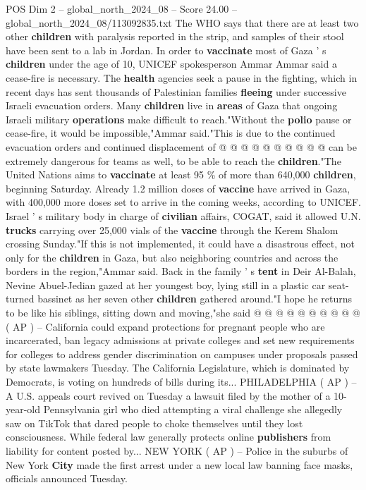 \begin{textsample}{POS Dim 2 – global\_north\_2024\_08 – Score 24.00 – global\_north\_2024\_08/113092835.txt}
The WHO says that there are at least two other \textbf{children} with paralysis reported in the strip, and samples of their stool have been sent to a lab in Jordan.
In order to \textbf{vaccinate} most of Gaza ' s \textbf{children} under the age of 10, UNICEF spokesperson Ammar Ammar said a cease-fire is necessary.
The \textbf{health} agencies seek a pause in the fighting, which in recent days has sent thousands of Palestinian families \textbf{fleeing} under successive Israeli evacuation orders.
Many \textbf{children} live in \textbf{areas} of Gaza that ongoing Israeli military \textbf{operations} make difficult to reach."Without the \textbf{polio} pause or cease-fire, it would be impossible,"Ammar said."This is due to the continued evacuation orders and continued displacement of @ @ @ @ @ @ @ @ @ @ can be extremely dangerous for teams as well, to be able to reach the \textbf{children}."The United Nations aims to \textbf{vaccinate} at least 95 \% of more than 640,000 \textbf{children}, beginning Saturday.
Already 1.2 million doses of \textbf{vaccine} have arrived in Gaza, with 400,000 more doses set to arrive in the coming weeks, according to UNICEF.
Israel ' s military body in charge of \textbf{civilian} affairs, COGAT, said it allowed U.N. \textbf{trucks} carrying over 25,000 vials of the \textbf{vaccine} through the Kerem Shalom crossing Sunday."If this is not implemented, it could have a disastrous effect, not only for the \textbf{children} in Gaza, but also neighboring countries and across the borders in the region,"Ammar said.
Back in the family ' s \textbf{tent} in Deir Al-Balah, Nevine Abuel-Jedian gazed at her youngest boy, lying still in a plastic car seat-turned bassinet as her seven other \textbf{children} gathered around."I hope he returns to be like his siblings, sitting down and moving,"she said @ @ @ @ @ @ @ @ @ @ ( AP ) -- California could expand protections for pregnant people who are incarcerated, ban legacy admissions at private colleges and set new requirements for colleges to address gender discrimination on campuses under proposals passed by state lawmakers Tuesday.
The California Legislature, which is dominated by Democrats, is voting on hundreds of bills during its...
PHILADELPHIA ( AP ) -- A U.S. appeals court revived on Tuesday a lawsuit filed by the mother of a 10-year-old Pennsylvania girl who died attempting a viral challenge she allegedly saw on TikTok that dared people to choke themselves until they lost consciousness.
While federal law generally protects online \textbf{publishers} from liability for content posted by...
NEW YORK ( AP ) -- Police in the suburbs of New York \textbf{City} made the first arrest under a new local law banning face masks, officials announced Tuesday.

\end{textsample}
